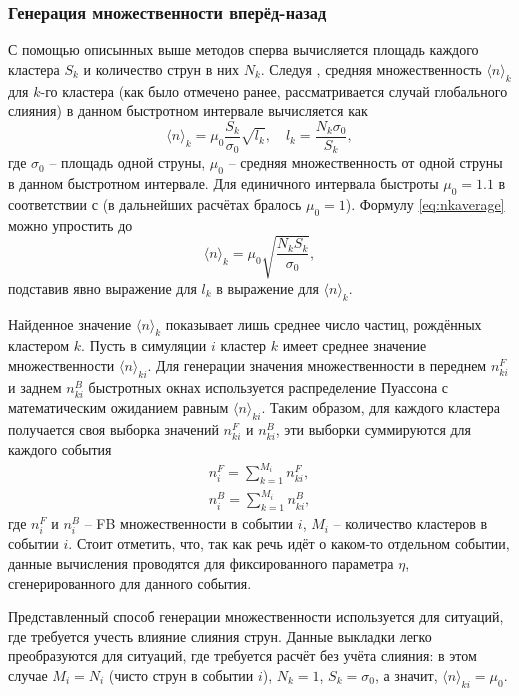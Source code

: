\subsubsection{Генерация множественности вперёд-назад}
С помощью описынных выше методов сперва вычисляется площадь каждого кластера $S_k$ и количество струн в них $N_k$. Следуя \cite{MulReduction}, средняя множественность $\langle n \rangle_k$ для $k$-го кластера (как было отмечено ранее, рассматривается случай глобального слияния) в данном быстротном интервале вычисляется как 
\begin{equation} \label{eq:nkaverage}
	\langle n \rangle_k = \mu_0 \frac{S_k}{\sigma_0}\sqrt{l_k}, \quad l_k = \frac{N_k \sigma_0}{S_k},
\end{equation}
где $\sigma_0$ -- площадь одной струны, $\mu_0$ -- средняя множественность от одной струны в данном быстротном интервале. Для единичного интервала быстроты $\mu_0 = 1.1$ в соответствии с \cite{Mu0} (в дальнейших расчётах бралось $\mu_0 = 1$). Формулу \ref{eq:nkaverage} можно упростить до 
\begin{equation} \label{eq:nksimple}
	\langle n \rangle_k = \mu_0 \sqrt{\frac{N_k S_k}{\sigma_0}},
\end{equation}
подставив явно выражение для $l_k$ в выражение для $\langle n \rangle_k$.

Найденное значение $\langle n \rangle_k$ показывает лишь среднее число частиц, рождённых кластером $k$. Пусть в симуляции $i$ кластер $k$ имеет среднее значение множественности $\langle n \rangle_{ki}$. Для генерации значения множественности в переднем $n^F_{ki}$ и заднем $n^B_{ki}$ быстротных окнах используется распределение Пуассона с математическим ожиданием равным $\langle n \rangle_{ki}$. Таким образом, для каждого кластера получается своя выборка значений $n^F_{ki}$ и $n^B_{ki}$, эти выборки суммируются для каждого события 
\begin{equation} \label{eq:nfnb}
\begin{split}
	n^F_i = \sum_{k = 1}^{M_i} n^F_{ki}, \\
	n^B_i = \sum_{k = 1}^{M_i} n^B_{ki},
\end{split}
\end{equation}
где $n^F_i$ и $n^B_i$ -- FB множественности в событии $i$, $M_i$ -- количество кластеров в событии $i$. Стоит отметить, что, так как речь идёт о каком-то отдельном событии, данные вычисления проводятся для фиксированного параметра $\eta$, сгенерированного для данного события. 

Представленный способ генерации множественности используется для ситуаций, где требуется учесть влияние слияния струн. Данные выкладки легко преобразуются для ситуаций, где требуется расчёт без учёта слияния: в этом случае $M_i = N_i$ (чисто струн в событии $i$), $N_k = 1$, $S_k = \sigma_0$, а значит, $\langle n \rangle_{ki} = \mu_0$.
